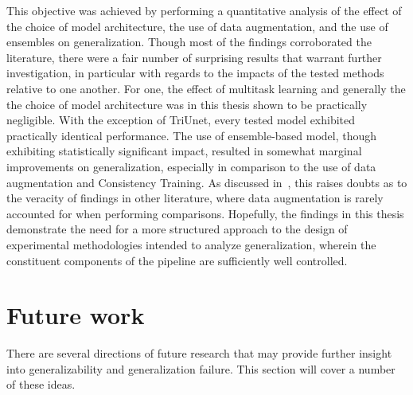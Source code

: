 This objective was achieved by performing a quantitative analysis of the effect of the choice of model architecture, the use of data augmentation, and the use of ensembles on generalization. Though most of the findings corroborated the literature, there were a fair number of surprising results that warrant further investigation, in particular with regards to the impacts of the tested methods relative to one another. For one, the effect of multitask learning and generally the the choice of model architecture was in this thesis shown to be practically negligible. With the exception of TriUnet, every tested model exhibited practically identical performance. The use of ensemble-based model, though exhibiting statistically significant impact, resulted in somewhat marginal improvements on generalization, especially in comparison to the use of data augmentation and Consistency Training. As discussed in~, this raises doubts as to the veracity of findings in other literature, where data augmentation is rarely accounted for when performing comparisons. Hopefully, the findings in this thesis demonstrate the need for a more structured approach to the design of experimental methodologies intended to analyze generalization, wherein the constituent components of the pipeline are sufficiently well controlled. 


\section{Future work} \label{future_work}
  There are several directions of future research that may provide further insight into generalizability and generalization failure. This section will cover a number of these ideas. 
